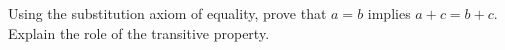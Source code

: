 Using the substitution axiom of equality, prove that $ a=b $ implies $ a+c=b+c $. Explain the role of the transitive property.

